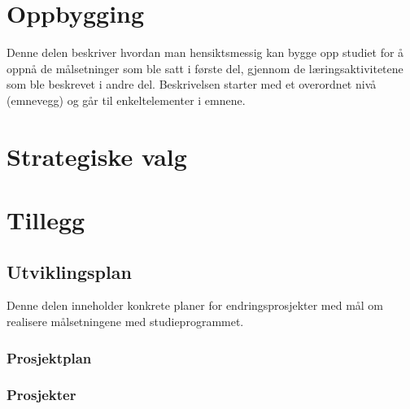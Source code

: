 \documentclass[a4paper, oneside, 12pt]{memoir}
\begin{document}
\part{Oppbygging}
\label{part:program-structure}

Denne delen beskriver hvordan man hensiktsmessig kan bygge opp studiet for å oppnå de målsetninger som ble satt i første del, gjennom de læringsaktivitetene som ble beskrevet i andre del. Beskrivelsen starter med et overordnet nivå (emnevegg) og går til enkeltelementer i emnene.

\part{Strategiske valg}

\ifappendix
\appendix

\renewcommand{\appendixtocname}{Tillegg}
\renewcommand{\appendixpagename}{Tillegg}
\part*{Tillegg}

\chapter{Utviklingsplan}

Denne delen inneholder konkrete planer for endringsprosjekter med mål om realisere målsetningene med studieprogrammet.

\section{Prosjektplan}

\section{Prosjekter}

	


	



\end{document}

